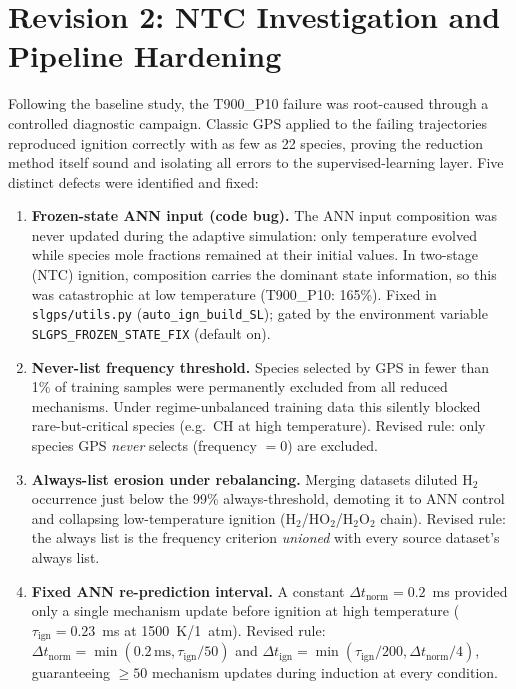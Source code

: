 \documentclass[11pt,a4paper]{article}
\begin{document}
\section{Revision 2: NTC Investigation and Pipeline Hardening}
\label{sec:revision2}

Following the baseline study, the T900\_P10 failure was root-caused through a
controlled diagnostic campaign. Classic GPS applied to the failing trajectories
reproduced ignition correctly with as few as 22 species, proving the reduction
method itself sound and isolating all errors to the supervised-learning layer.
Five distinct defects were identified and fixed:

\begin{enumerate}
    \item \textbf{Frozen-state ANN input (code bug).} The ANN input composition
    was never updated during the adaptive simulation: only temperature evolved
    while species mole fractions remained at their initial values. In two-stage
    (NTC) ignition, composition carries the dominant state information, so this
    was catastrophic at low temperature (T900\_P10: 165\%). Fixed in
    \texttt{slgps/utils.py} (\texttt{auto\_ign\_build\_SL}); gated by the
    environment variable \texttt{SLGPS\_FROZEN\_STATE\_FIX} (default on).

    \item \textbf{Never-list frequency threshold.} Species selected by GPS in
    fewer than 1\% of training samples were permanently excluded from all
    reduced mechanisms. Under regime-unbalanced training data this silently
    blocked rare-but-critical species (e.g.\ CH at high temperature). Revised
    rule: only species GPS \emph{never} selects (frequency $=0$) are excluded.

    \item \textbf{Always-list erosion under rebalancing.} Merging datasets
    diluted H$_2$ occurrence just below the 99\% always-threshold, demoting it
    to ANN control and collapsing low-temperature ignition (H$_2$/HO$_2$/H$_2$O$_2$
    chain). Revised rule: the always list is the frequency criterion
    \emph{unioned} with every source dataset's always list.

    \item \textbf{Fixed ANN re-prediction interval.} A constant
    $\Delta t_{\text{norm}}=0.2$~ms provided only a single mechanism update
    before ignition at high temperature ($\tau_{\text{ign}}=0.23$~ms at
    1500~K/1~atm). Revised rule: $\Delta t_{\text{norm}} = \min(0.2\,\text{ms},
    \tau_{\text{ign}}/50)$ and $\Delta t_{\text{ign}} = \min(\tau_{\text{ign}}/200,
    \Delta t_{\text{norm}}/4)$, guaranteeing $\geq 50$ mechanism updates during
    induction at every condition.


\end{enumerate}
\end{document}
